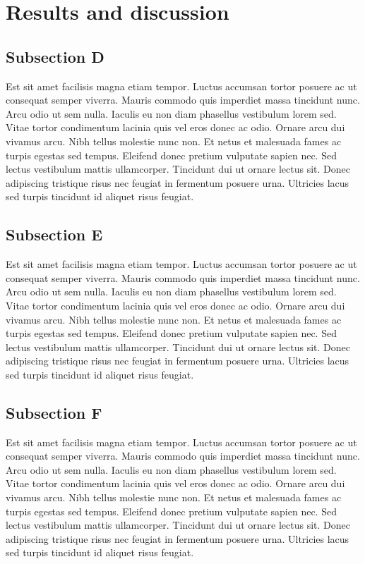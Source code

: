 \documentclass[12pt]{article}
\begin{document}
\section{Results and discussion} \label{sec:results}

\subsection{Subsection D} \label{sec:subd}

\par Est sit amet facilisis magna etiam tempor. Luctus accumsan tortor posuere ac ut consequat semper viverra. Mauris commodo quis imperdiet massa tincidunt nunc. Arcu odio ut sem nulla. Iaculis eu non diam phasellus vestibulum lorem sed. Vitae tortor condimentum lacinia quis vel eros donec ac odio. Ornare arcu dui vivamus arcu. Nibh tellus molestie nunc non. Et netus et malesuada fames ac turpis egestas sed tempus. Eleifend donec pretium vulputate sapien nec. Sed lectus vestibulum mattis ullamcorper. Tincidunt dui ut ornare lectus sit. Donec adipiscing tristique risus nec feugiat in fermentum posuere urna. Ultricies lacus sed turpis tincidunt id aliquet risus feugiat. 

\subsection{Subsection E} \label{sec:subd}

\par Est sit amet facilisis magna etiam tempor. Luctus accumsan tortor posuere ac ut consequat semper viverra. Mauris commodo quis imperdiet massa tincidunt nunc. Arcu odio ut sem nulla. Iaculis eu non diam phasellus vestibulum lorem sed. Vitae tortor condimentum lacinia quis vel eros donec ac odio. Ornare arcu dui vivamus arcu. Nibh tellus molestie nunc non. Et netus et malesuada fames ac turpis egestas sed tempus. Eleifend donec pretium vulputate sapien nec. Sed lectus vestibulum mattis ullamcorper. Tincidunt dui ut ornare lectus sit. Donec adipiscing tristique risus nec feugiat in fermentum posuere urna. Ultricies lacus sed turpis tincidunt id aliquet risus feugiat. 

\subsection{Subsection F} \label{sec:subd}

\par Est sit amet facilisis magna etiam tempor. Luctus accumsan tortor posuere ac ut consequat semper viverra. Mauris commodo quis imperdiet massa tincidunt nunc. Arcu odio ut sem nulla. Iaculis eu non diam phasellus vestibulum lorem sed. Vitae tortor condimentum lacinia quis vel eros donec ac odio. Ornare arcu dui vivamus arcu. Nibh tellus molestie nunc non. Et netus et malesuada fames ac turpis egestas sed tempus. Eleifend donec pretium vulputate sapien nec. Sed lectus vestibulum mattis ullamcorper. Tincidunt dui ut ornare lectus sit. Donec adipiscing tristique risus nec feugiat in fermentum posuere urna. Ultricies lacus sed turpis tincidunt id aliquet risus feugiat. 
\end{document}
